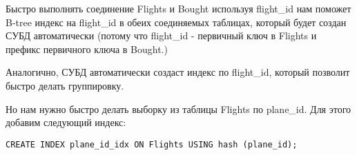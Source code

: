 \documentclass{article}
\begin{document}
Быстро выполнять соединение Flights и Bought используя flight\_id нам поможет B-tree индекс на flight\_id в обеих соединяемых таблицах, который будет создан СУБД автоматически (потому что flight\_id - первичный ключ в Flights и префикс первичного ключа в Bought.)

Аналогично, СУБД автоматически создаст индекс по flight\_id, который позволит быстро делать группировку.

Но нам нужно быстро делать выборку из таблицы Flights по plane\_id. Для этого добавим следующий индекс:

\begin{verbatim}
CREATE INDEX plane_id_idx ON Flights USING hash (plane_id);
\end{verbatim}
\end{document}
